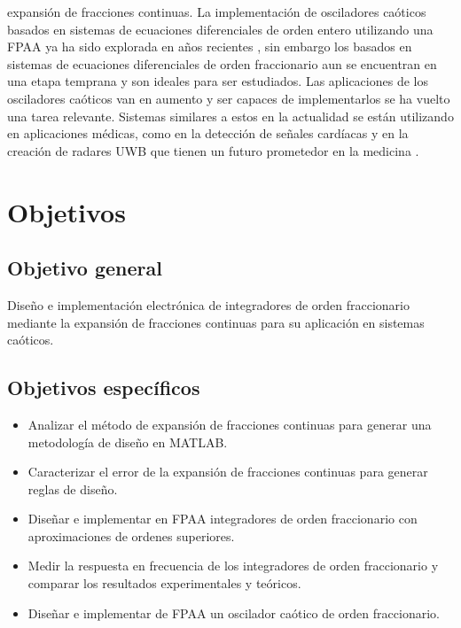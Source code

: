 expansión de fracciones continuas. La implementación de osciladores caóticos basados en sistemas de ecuaciones diferenciales de orden entero utilizando una FPAA ya ha sido explorada en años recientes \cite{Li2018}, sin embargo los basados en sistemas de ecuaciones diferenciales de orden fraccionario aun se encuentran en una etapa temprana y son ideales para ser estudiados. Las aplicaciones de los osciladores caóticos van en aumento y ser capaces de implementarlos se ha vuelto una tarea relevante. Sistemas similares a estos en la actualidad se están utilizando en aplicaciones médicas, como en la detección de señales cardíacas \cite{Jiang2010} y en la creación de radares UWB que tienen un futuro prometedor en la medicina \cite{Kumari2017}.
	
	\section{Objetivos}
	
		\subsection{Objetivo general}
			Diseño e implementación electrónica de integradores de orden fraccionario mediante la expansión de fracciones continuas para su aplicación en sistemas caóticos.		
		
		\subsection{Objetivos específicos}
			\begin{itemize}
			\item Analizar el método de expansión de fracciones continuas para generar una metodología de diseño en MATLAB.
			\item Caracterizar el error de la expansión de fracciones continuas para generar reglas de diseño.
			\item Diseñar e implementar en FPAA integradores de orden fraccionario con aproximaciones de ordenes superiores.
			\item Medir la respuesta en frecuencia de los integradores de orden fraccionario y comparar los resultados experimentales y teóricos.
			\item Diseñar e implementar de FPAA un oscilador caótico de orden fraccionario. 
		\end{itemize}
		
